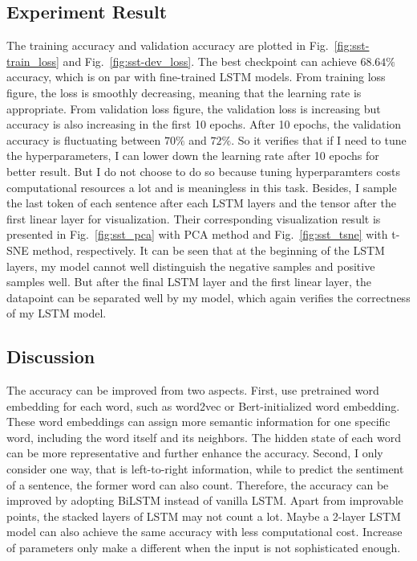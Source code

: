 \subsection{Experiment Result}
The training accuracy and validation accuracy are plotted in Fig.~\ref{fig:sst-train_loss} and Fig.~\ref{fig:sst-dev_loss}. 
The best checkpoint can achieve $68.64\%$ accuracy, which is on par with fine-trained LSTM models.
From training loss figure, the loss is smoothly decreasing, meaning that the learning rate is appropriate.
From validation loss figure, the validation loss is increasing but accuracy is also increasing in the first 10 epochs. 
After 10 epochs, the validation accuracy is fluctuating between $70\%$ and $72\%$.
So it verifies that if I need to tune the hyperparameters, I can lower down the learning rate after 10 epochs for better result.
But I do not choose to do so because tuning hyperparamters costs computational resources a lot and is meaningless in this task.
\newline
\newline
\noindent 
Besides, I sample the last token of each sentence after each LSTM layers and the tensor after the first linear layer for visualization.
Their corresponding visualization result is presented in Fig.~\ref{fig:sst_pca} with PCA method and Fig.~\ref{fig:sst_tsne} with t-SNE method, respectively.
It can be seen that at the beginning of the LSTM layers, my model cannot well distinguish the negative samples and positive samples well.
But after the final LSTM layer and the first linear layer, the datapoint can be separated well by my model, which again verifies the correctness of my LSTM model.

\subsection{Discussion}
The accuracy can be improved from two aspects. First, use pretrained word embedding for each word, such as word2vec or Bert-initialized word embedding. 
These word embeddings can assign more semantic information for one specific word, including the word itself and its neighbors.
The hidden state of each word can be more representative and further enhance the accuracy.
\newline
\newline
\noindent 
Second, I only consider one way, that is left-to-right information, while to predict the sentiment of a sentence, the former word can also count.
Therefore, the accuracy can be improved by adopting BiLSTM instead of vanilla LSTM.
\newline
\newline
\noindent 
Apart from improvable points, the stacked layers of LSTM may not count a lot. 
Maybe a 2-layer LSTM model can also achieve the same accuracy with less computational cost. 
Increase of parameters only make a different when the input is not sophisticated enough.